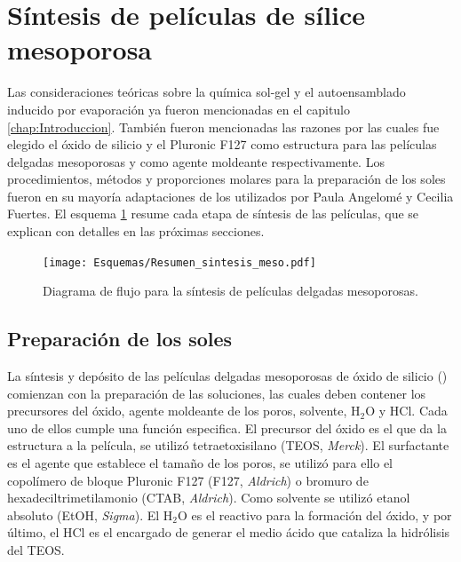 \section{Síntesis de películas de sílice mesoporosa}\label{sec:sintesis_mesoporosos}	
	Las consideraciones teóricas sobre la química sol-gel y el autoensamblado inducido por evaporación ya fueron mencionadas en el capitulo \ref{chap:Introduccion}. También fueron mencionadas las razones por las cuales fue elegido el óxido de silicio y el Pluronic F127 como estructura para las películas delgadas mesoporosas y como agente moldeante respectivamente. Los procedimientos, métodos y proporciones molares para la preparación de los soles fueron en su mayoría adaptaciones de los utilizados por Paula Angelomé\cite{Angelome2008} y Cecilia Fuertes\cite{Fuertes2009}. El esquema \ref{esq:peliculas_meso} resume cada etapa de síntesis de las películas, que se explican con detalles en las próximas secciones.
		  \begin{figure}[ht]
			  \begin{center}
			  \texttt{[image: Esquemas/Resumen\_sintesis\_meso.pdf]}
			  \caption[Síntesis de películas delgadas mesoporosas]{Diagrama de flujo para la síntesis de películas delgadas mesoporosas.}
			  \label{esq:peliculas_meso}
			  \end{center}
			  \end{figure}

	\subsection{Preparación de los soles}
		La síntesis y depósito de las películas delgadas mesoporosas de óxido de silicio (\pdm) comienzan con la preparación de las soluciones, las cuales deben contener los precursores del óxido, agente moldeante de los poros, solvente, H$_2$O y HCl\cite{Brinker1990}. Cada uno de ellos cumple una función especifica. El precursor del óxido es el que da la estructura a la película, se utilizó tetraetoxisilano (TEOS, \textit{Merck}). El surfactante es el agente que establece el tamaño de los poros, se utilizó para ello el copolímero de bloque Pluronic F127 (F127, \textit{Aldrich}) o bromuro de hexadeciltrimetilamonio (CTAB, \textit{Aldrich}). Como solvente se utilizó etanol absoluto (EtOH, \textit{Sigma}). El H$_2$O es el reactivo para la formación del óxido, y por último, el HCl es el encargado de generar el medio ácido que cataliza la hidrólisis del TEOS. 
		
